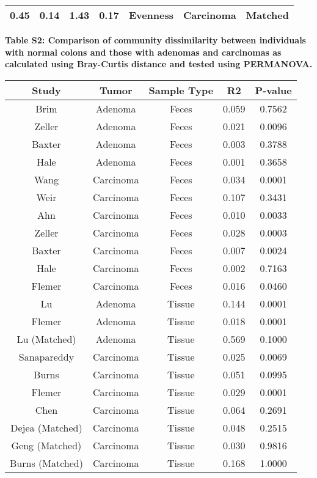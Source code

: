 \documentclass[12pt,]{article}
\begin{document}
\begin{longtable}[]{@{}ccccccc@{}}
\begin{minipage}[t]{0.09\columnwidth}
0.45\strut
\end{minipage} & \begin{minipage}[t]{0.16\columnwidth}\centering\strut
0.14\strut
\end{minipage} & \begin{minipage}[t]{0.16\columnwidth}\centering\strut
1.43\strut
\end{minipage} & \begin{minipage}[t]{0.07\columnwidth}\centering\strut
0.17\strut
\end{minipage} & \begin{minipage}[t]{0.14\columnwidth}\centering\strut
Evenness\strut
\end{minipage} & \begin{minipage}[t]{0.09\columnwidth}\centering\strut
Carcinoma\strut
\end{minipage} & \begin{minipage}[t]{0.11\columnwidth}\centering\strut
Matched\strut
\end{minipage}\tabularnewline
\bottomrule
\end{longtable}

\normalsize

\newpage

\textbf{Table S2: Comparison of community dissimilarity between
individuals with normal colons and those with adenomas and carcinomas as
calculated using Bray-Curtis distance and tested using PERMANOVA.}

\begin{longtable}[]{@{}ccccc@{}}
\toprule
Study & Tumor & Sample Type & R2 & P-value\tabularnewline
\midrule
\endhead
Brim & Adenoma & Feces & 0.059 & 0.7562\tabularnewline
Zeller & Adenoma & Feces & 0.021 & 0.0096\tabularnewline
Baxter & Adenoma & Feces & 0.003 & 0.3788\tabularnewline
Hale & Adenoma & Feces & 0.001 & 0.3658\tabularnewline
Wang & Carcinoma & Feces & 0.034 & 0.0001\tabularnewline
Weir & Carcinoma & Feces & 0.107 & 0.3431\tabularnewline
Ahn & Carcinoma & Feces & 0.010 & 0.0033\tabularnewline
Zeller & Carcinoma & Feces & 0.028 & 0.0003\tabularnewline
Baxter & Carcinoma & Feces & 0.007 & 0.0024\tabularnewline
Hale & Carcinoma & Feces & 0.002 & 0.7163\tabularnewline
Flemer & Carcinoma & Feces & 0.016 & 0.0460\tabularnewline
Lu & Adenoma & Tissue & 0.144 & 0.0001\tabularnewline
Flemer & Adenoma & Tissue & 0.018 & 0.0001\tabularnewline
Lu (Matched) & Adenoma & Tissue & 0.569 & 0.1000\tabularnewline
Sanapareddy & Carcinoma & Tissue & 0.025 & 0.0069\tabularnewline
Burns & Carcinoma & Tissue & 0.051 & 0.0995\tabularnewline
Flemer & Carcinoma & Tissue & 0.029 & 0.0001\tabularnewline
Chen & Carcinoma & Tissue & 0.064 & 0.2691\tabularnewline
Dejea (Matched) & Carcinoma & Tissue & 0.048 & 0.2515\tabularnewline
Geng (Matched) & Carcinoma & Tissue & 0.030 & 0.9816\tabularnewline
Burns (Matched) & Carcinoma & Tissue & 0.168 & 1.0000\tabularnewline
\bottomrule
\end{longtable}
\end{document}
